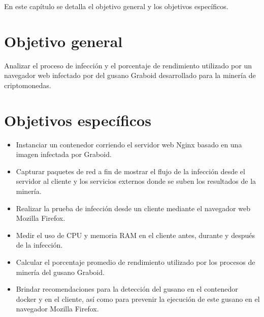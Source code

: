 \documentclass[../main/main.tex]{subfiles}
\begin{document}
\espacio

  En este capítulo se detalla el objetivo general y los objetivos específicos.

  \section{Objetivo general}

  Analizar el proceso de infección y el porcentaje de rendimiento utilizado por un navegador web infectado por del gusano Graboid desarrollado para la minería de criptomonedas.

  \section{Objetivos específicos}

  \begin{itemize}
    \item Instanciar un contenedor corriendo el servidor web Nginx basado en una imagen infectada por Graboid.
    \item Capturar paquetes de red a fin de mostrar el flujo de la infección desde el servidor al cliente y los servicios externos donde se suben los resultados de la minería.
    \item Realizar la prueba de infección desde un cliente mediante el navegador web Mozilla Firefox.
    \item Medir el uso de CPU y memoria RAM en el cliente antes, durante y después de la infección.
    \item Calcular el porcentaje promedio de rendimiento utilizado por los procesos de minería del gusano Graboid.
    \item Brindar recomendaciones para la detección del gusano en el contenedor docker y en el cliente, así como para prevenir la ejecución de este gusano en el navegador Mozilla Firefox.
  \end{itemize}
\end{document}
